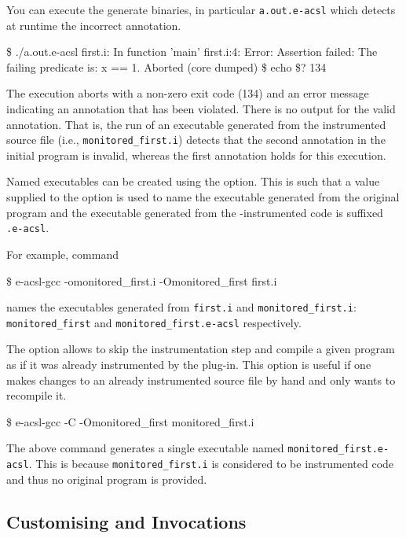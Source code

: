 You can execute the generate binaries, in particular \texttt{a.out.e-acsl} which
detects at runtime the incorrect annotation.
\begin{logs}
\$ ./a.out.e-acsl
first.i: In function 'main'
first.i:4: Error: Assertion failed:
        The failing predicate is:
        x == 1.
Aborted (core dumped)
\$ echo \$?
134
\end{logs}
The execution aborts with a non-zero exit code (134) and an error message
indicating an \eacsl annotation that has been violated. There is no output for
the valid \eacsl annotation. That is, the run of an executable generated from
the instrumented source file (i.e., \texttt{monitored\_first.i}) detects that
the second annotation in the initial program is invalid, whereas the first
annotation holds for this execution.

Named executables can be created using the  option.  This is such
that a value supplied to the  option is used to name the executable
generated from the original program and the executable generated from the
\eacsl-instrumented code is suffixed \texttt{.e-acsl}.

For example, command
\begin{frama-c-commands}
\$ e-acsl-gcc -omonitored_first.i -Omonitored_first first.i
\end{frama-c-commands}
names the executables generated from \texttt{first.i} and
\texttt{monitored\_first.i}: \texttt{monitored\_first} and
\texttt{monitored\_first.e-acsl} respectively.

The \eacslgcc {} option allows to skip the instrumentation step and
compile a given program as if it was already instrumented by the \eacsl
plug-in.  This option is useful if one makes changes to an already
instrumented source file by hand and only wants to recompile it.

\begin{frama-c-commands}
\$ e-acsl-gcc -C -Omonitored_first monitored_first.i
\end{frama-c-commands}

The above command generates a single executable named
\texttt{monitored\_first.e-acsl}. This is because \texttt{monitored\_first.i} is
considered to be instrumented code and thus no original program is provided.

\subsection{Customising \framac and \gcc Invocations}

